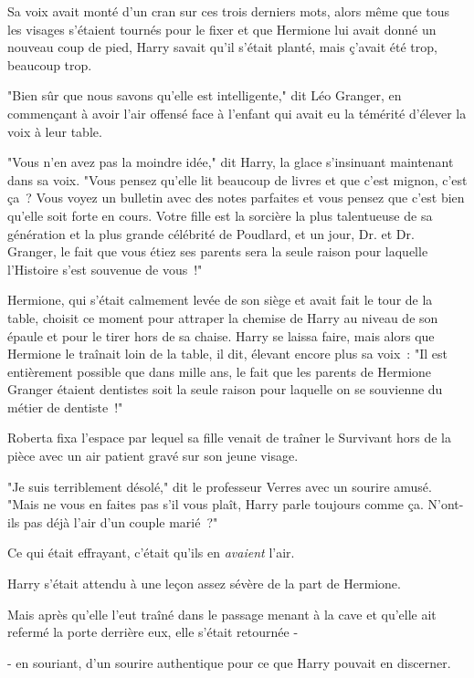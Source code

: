 Sa voix avait monté d'un cran sur ces trois derniers mots, alors même que tous les visages s'étaient tournés pour le fixer et que Hermione lui avait donné un nouveau coup de pied, Harry savait qu'il s'était planté, mais ç'avait été trop, beaucoup trop.

"Bien sûr que nous savons qu'elle est intelligente," dit Léo Granger, en commençant à avoir l'air offensé face à l'enfant qui avait eu la témérité d'élever la voix à leur table.

"Vous n'en avez pas la moindre idée," dit Harry, la glace s'insinuant maintenant dans sa voix. "Vous pensez qu'elle lit beaucoup de livres et que c'est mignon, c'est ça~? Vous voyez un bulletin avec des notes parfaites et vous pensez que c'est bien qu'elle soit forte en cours. Votre fille est la sorcière la plus talentueuse de sa génération et la plus grande célébrité de Poudlard, et un jour, Dr. et Dr. Granger, le fait que vous étiez ses parents sera la seule raison pour laquelle l'Histoire s'est souvenue de vous~!"

Hermione, qui s'était calmement levée de son siège et avait fait le tour de la table, choisit ce moment pour attraper la chemise de Harry au niveau de son épaule et pour le tirer hors de sa chaise. Harry se laissa faire, mais alors que Hermione le traînait loin de la table, il dit, élevant encore plus sa voix~: "Il est entièrement possible que dans mille ans, le fait que les parents de Hermione Granger étaient dentistes soit la seule raison pour laquelle on se souvienne du métier de dentiste~!"

\later

Roberta fixa l'espace par lequel sa fille venait de traîner le Survivant hors de la pièce avec un air patient gravé sur son jeune visage.

"Je suis terriblement désolé," dit le professeur Verres avec un sourire amusé. "Mais ne vous en faites pas s'il vous plaît, Harry parle toujours comme ça. N'ont-ils pas déjà l'air d'un couple marié~?"

Ce qui était effrayant, c'était qu'ils en \emph{avaient} l'air.

\later

Harry s'était attendu à une leçon assez sévère de la part de Hermione.

Mais après qu'elle l'eut traîné dans le passage menant à la cave et qu'elle ait refermé la porte derrière eux, elle s'était retournée -

- en souriant, d'un sourire authentique pour ce que Harry pouvait en discerner.

